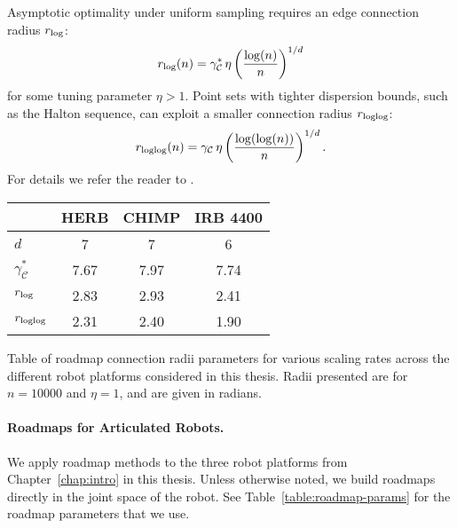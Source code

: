 Asymptotic optimality under uniform sampling requires
an edge connection radius $r_{\mbox{\scriptsize log}}$:
\begin{equation}
   r_{\mbox{\scriptsize log}}(n) =  \gamma^*_{\mathcal{C}} \, \eta
      \left( \frac{\log(n)}{n} \right)^{1/d}
\end{equation}
for some tuning parameter $\eta > 1$.
Point sets with tighter dispersion bounds,
such as the Halton sequence,
can exploit a smaller connection radius $r_{\mbox{\scriptsize loglog}}$:
\begin{equation}
   r_{\mbox{\scriptsize loglog}}(n) = \gamma_{\mathcal{C}} \, \eta
      \left( \frac{\log(\log(n))}{n} \right)^{1/d}.
\end{equation}
For details we refer the reader
to \citep{janson2015deterministicsampling}.

\begin{margintable}
   \centering
   {\renewcommand{\tabcolsep}{0.15cm}
   \begin{tabular}{lccc}
      \toprule
      & HERB & CHIMP & IRB 4400 \\
      \midrule
      $d$ & 7 & 7 & 6 \\
      $\gamma^*_{\mathcal{C}}$ & 7.67 & 7.97 & 7.74 \\
      $r_{\mbox{\scriptsize log}}$ & 2.83 & 2.93 & 2.41 \\
      $r_{\mbox{\scriptsize loglog}}$ & 2.31 & 2.40 & 1.90 \\
      \bottomrule
   \end{tabular}
   }
   \vspace{0.1cm}
   \caption{Table of roadmap connection radii parameters for
      various scaling rates across the different robot platforms
      considered in this thesis.
      Radii presented are for $n=10000$ and $\eta = 1$,
      and are given in radians.}
   \label{table:roadmap-params}
\end{margintable}

\paragraph{Roadmaps for Articulated Robots.}
We apply roadmap methods to the three robot platforms
from Chapter~\ref{chap:intro} in this thesis.
Unless otherwise noted,
we build roadmaps directly in the joint space of the robot.
See Table~\ref{table:roadmap-params} for the roadmap parameters
that we use.


